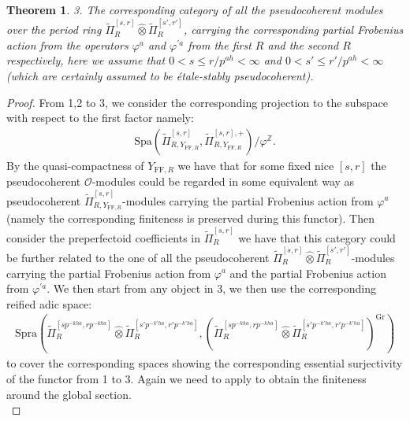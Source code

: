\documentclass[12pt]{amsart}
\newtheorem{theorem}{Theorem}[section]
\theoremstyle{definition}
\numberwithin{equation}{section}
\begin{document}
\begin{theorem}
3. The corresponding category of all the pseudocoherent modules over the period ring $\widetilde{\Pi}^{[s,r]}_{R}\widehat{\otimes}\widetilde{\Pi}^{[s',r']}_{R}$, carrying the corresponding partial Frobenius action from the operators $\varphi^a$ and $\varphi^{'a}$ from the first $R$ and the second $R$ respectively, here we assume that $0<s\leq r/p^{ah}<\infty$ and $0<s'\leq r'/p^{ah}<\infty$ (which are certainly assumed to be \'etale-stably pseudocoherent).\\
\end{theorem}


\begin{proof}
From 1,2 to 3, we consider the corresponding projection to the subspace with respect to the first factor namely:
\begin{align}
\mathrm{Spa}(\widetilde{\Pi}^{[s,r]}_{R,Y_{\mathrm{FF},R}},\widetilde{\Pi}^{[s,r],+}_{R,Y_{\mathrm{FF},R}})\slash \varphi^\mathbb{Z}.	
\end{align}
By the quasi-compactness of $Y_{\mathrm{FF},R}$ we have that for some fixed nice $[s,r]$ the pseudocoherent $\mathcal{O}$-modules could be regarded in some equivalent way as pseudocoherent $\widetilde{\Pi}^{[s,r]}_{R,Y_{\mathrm{FF},R}}$-modules carrying the partial Frobenius action from $\varphi^a$ (namely the corresponding finiteness is preserved during this functor). Then consider the preperfectoid coefficients in $\widetilde{\Pi}^{[s,r]}_{R}$ we have that this category could be further related to the one of all the pseudocoherent $\widetilde{\Pi}^{[s,r]}_{R}\widehat{\otimes}\widetilde{\Pi}^{[s',r']}_{R}$-modules carrying the partial Frobenius action from $\varphi^a$ and the partial Frobenius action from $\varphi^{'a}$. We then start from any object in 3, we then use the corresponding reified adic space:
\begin{align}
\mathrm{Spra}(\widetilde{\Pi}^{[sp^{-kha},rp^{-kha}]}_{R}\widehat{\otimes}\widetilde{\Pi}^{[s'p^{-k'ha},r'p^{-k'ha}]}_{R},(\widetilde{\Pi}^{[sp^{-kha},rp^{-kha}]}_{R}\widehat{\otimes}\widetilde{\Pi}^{[s'p^{-k'ha},r'p^{-k'ha}]}_{R})^\mathrm{Gr})	
\end{align}
to cover the corresponding spaces showing the corresponding essential surjectivity of the functor from 1 to 3. Again we need to apply \cite[Proposition 2.6.17]{KL2} to obtain the finiteness around the global section.\\
\end{proof}
\end{document}

